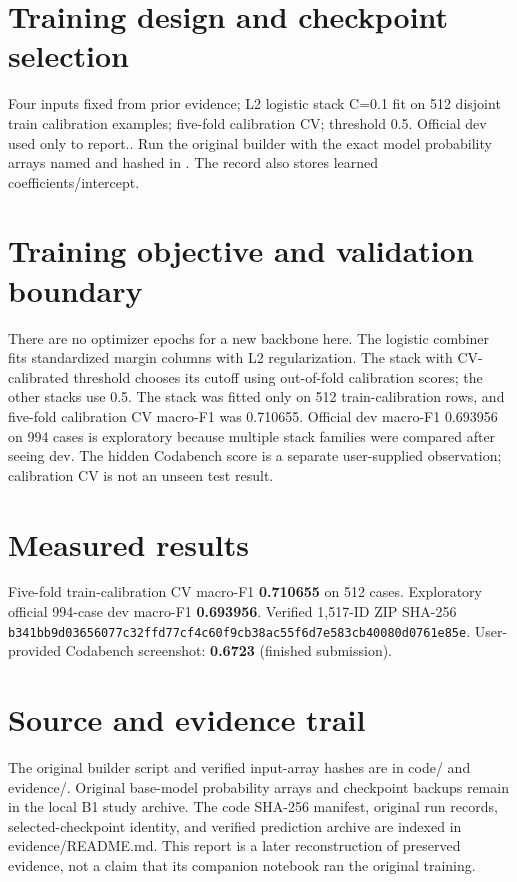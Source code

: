 \documentclass[11pt,a4paper]{article}
\begin{document}
\section{Training design and checkpoint selection}
Four inputs fixed from prior evidence; L2 logistic stack C=0.1 fit on 512 disjoint train calibration examples; five-fold calibration CV; threshold 0.5. Official dev used only to report.. Run the original builder  with the exact model probability arrays named and hashed in . The record also stores learned coefficients/intercept.
\section{Training objective and validation boundary}
There are no optimizer epochs for a new backbone here. The logistic combiner fits standardized margin columns with L2 regularization. The stack with CV-calibrated threshold chooses its cutoff using out-of-fold calibration scores; the other stacks use 0.5. The stack was fitted only on 512 train-calibration rows, and five-fold calibration CV macro-F1 was 0.710655. Official dev macro-F1 0.693956 on 994 cases is exploratory because multiple stack families were compared after seeing dev. The hidden Codabench score is a separate user-supplied observation; calibration CV is not an unseen test result.
\begin{minipage}{\linewidth}
\section{Measured results}
Five-fold train-calibration CV macro-F1 \textbf{0.710655} on 512 cases. Exploratory official 994-case dev macro-F1 \textbf{0.693956}. Verified 1,517-ID ZIP SHA-256 \texttt{b341bb9d03656077}\allowbreak\texttt{c32ffd77cf4c60f9}\allowbreak\texttt{cb38ac55f6d7e583}\allowbreak\texttt{cb40080d0761e85e}. User-provided Codabench screenshot: \textbf{0.6723} (finished submission).
\end{minipage}
\section{Source and evidence trail}
The original builder script and verified input-array hashes are in code/ and evidence/. Original base-model probability arrays and checkpoint backups remain in the local B1 study archive. The code SHA-256 manifest, original run records, selected-checkpoint identity, and verified prediction archive are indexed in evidence/README.md. This report is a later reconstruction of preserved evidence, not a claim that its companion notebook ran the original training.
\end{document}
